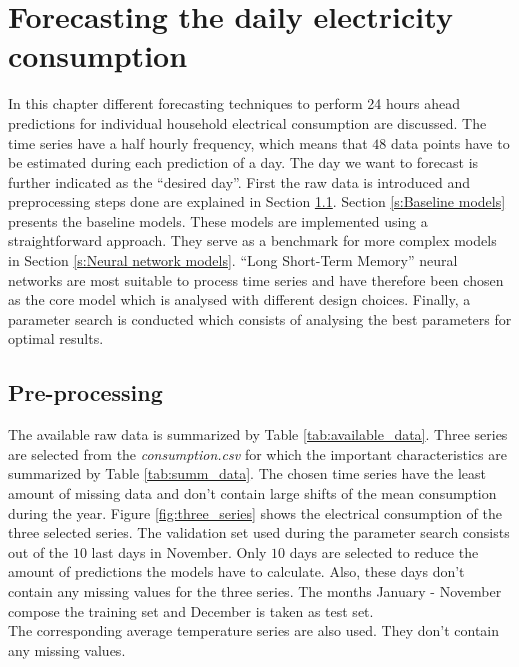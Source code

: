 \chapter{Forecasting the daily electricity consumption}
\label{cha:Forecasting the daily electricity consumption}
In this chapter different forecasting techniques to perform 24 hours ahead predictions for individual household electrical consumption are discussed. The time series have a half hourly frequency, which means that $ 48 $ data points have to be estimated during each prediction of a day. The day we want to forecast is further indicated as the ``desired day''. First the raw data is introduced and preprocessing steps done are explained in Section \ref{s:Preprocessing}. Section \ref{s:Baseline models} presents the baseline models. These models are implemented using a straightforward approach. They serve as a benchmark for more complex models in Section \ref{s:Neural network models}. ``Long Short-Term Memory'' neural networks are most suitable to process time series and have therefore been chosen as the core model which is analysed with different design choices. Finally, a parameter search is conducted which consists of analysing the best parameters for optimal results.
 
\section{Pre-processing}\label{s:Preprocessing}
The available raw data is summarized by Table \ref{tab:available_data}. 
Three series are selected from the \textit{consumption.csv} for which the important characteristics are summarized by Table \ref{tab:summ_data}. The chosen time series have the least amount of missing data and don't contain large shifts of the mean consumption during the year. Figure \ref{fig:three_series} shows the electrical consumption of the three selected series. The validation set used during the parameter search consists out of the $ 10 $ last days in November. Only $ 10 $ days are selected to reduce the amount of predictions the models have to calculate. Also, these days don't contain any missing values for the three series. The months January - November compose the training set and December is taken as test set.\\ 
The corresponding average temperature series are also used. They don't contain any missing values.

